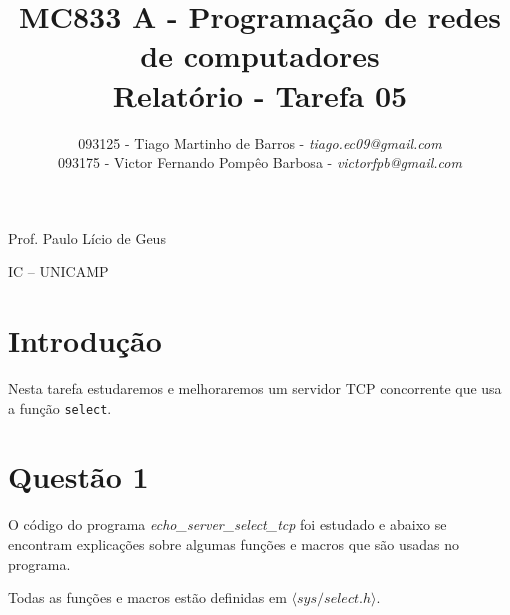 \documentclass[a4paper,10pt]{article}
\begin{document}


\title{MC833 A - Programação de redes de computadores\\
Relatório - Tarefa 05}

\author {   093125 - Tiago Martinho de Barros - \textit{tiago.ec09@gmail.com}\\
            093175 - Victor Fernando Pompêo Barbosa - \textit{victorfpb@gmail.com}}


\maketitle

\centerline{Prof. Paulo Lício de Geus}
\centerline{IC -- UNICAMP}

\vspace{2cm}
\tableofcontents
    
\newpage
\section{Introdução}
\hspace{14pt}

    Nesta tarefa estudaremos e melhoraremos um servidor TCP concorrente que usa a função {\tt select}.

\section{Questão 1}
O código do programa \textit{echo\_server\_select\_tcp} foi estudado e abaixo se encontram explicações sobre algumas funções e macros que são usadas no programa.

Todas as funções e macros estão definidas em $\langle sys/select.h \rangle$.
\end{document}
